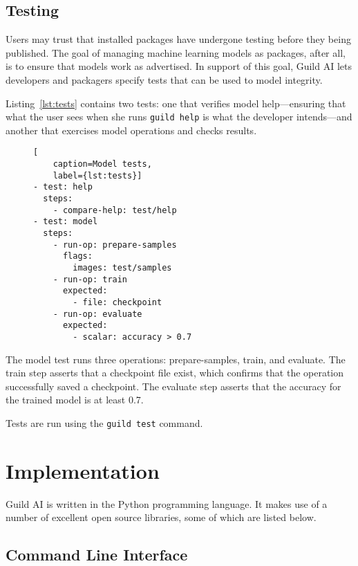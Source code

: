 \documentclass{article}
\begin{document}
\subsection{Testing}

Users may trust that installed packages have undergone testing before
they being published. The goal of managing machine learning models as
packages, after all, is to ensure that models work as advertised. In
support of this goal, Guild AI lets developers and packagers specify
tests that can be used to model integrity.

Listing~\ref{lst:tests} contains two tests: one that verifies model
help---ensuring that what the user sees when she runs
\verb|guild help| is what the developer intends---and another that
exercises model operations and checks results.

\begin{figure}
\begin{lstlisting}[
    caption=Model tests,
    label={lst:tests}]
- test: help
  steps:
    - compare-help: test/help
- test: model
  steps:
    - run-op: prepare-samples
      flags:
        images: test/samples
    - run-op: train
      expected:
        - file: checkpoint
    - run-op: evaluate
      expected:
        - scalar: accuracy > 0.7
\end{lstlisting}
\end{figure}

The model test runs three operations: prepare-samples, train, and
evaluate. The train step asserts that a checkpoint file exist, which
confirms that the operation successfully saved a checkpoint. The
evaluate step asserts that the accuracy for the trained model is at
least 0.7.

Tests are run using the \verb|guild test| command.

\iffalse
Tests may be run on an ad hoc basis or as a continuous integration
release process.
\fi

\iffalse
\section{Implementation}

Guild AI is written in the Python programming language. It makes use
of a number of excellent open source libraries, some of which are
listed below.

\subsection{Command Line Interface}
\end{document}
